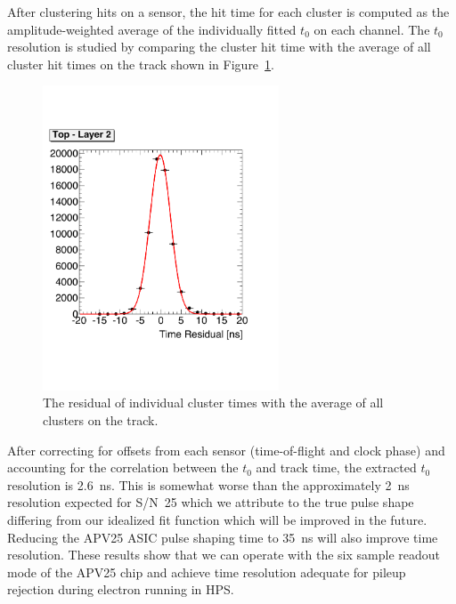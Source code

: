 \documentclass[final,3p,times,twocolumn]{elsarticle}
\begin{document}
After clustering hits on a sensor, the hit time for each cluster is computed 
as the amplitude-weighted average of the individually fitted $t_0$ on each channel. The 
$t_0$ resolution is studied by comparing the cluster hit time with the average of all cluster hit times on 
the track shown in Figure~\ref{fig:tracktime}. 
\begin{figure}[]
\begin{center}
{\small
	\includegraphics[width=7cm]{figures/test_run_1351_hit_time_corrected_top_layer2_mod.pdf}
	\caption{
	The residual of individual cluster times with the average of all clusters on the track. }
	\label{fig:tracktime}
}
\end{center}
\end{figure}
After correcting for offsets from each sensor (time-of-flight and clock phase) and accounting for the 
correlation between the $t_0$ and track time,  the extracted $t_0$ resolution is 2.6~ns. This is 
somewhat worse than the approximately 2~ns resolution expected for S/N~25 which we attribute to the 
true pulse shape differing from our idealized fit function which will be improved in the future. Reducing 
the APV25 ASIC pulse shaping time to 35~ns will also improve time resolution. 
These results show that we can operate with the six sample readout mode of the APV25 chip and 
achieve time resolution adequate for pileup rejection during electron running in HPS. 
\end{document}
